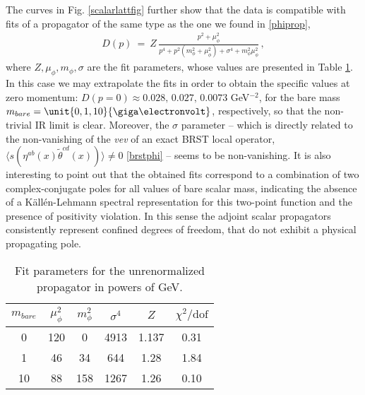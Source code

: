 The curves in Fig. \ref{scalarlattfig} further show that the data is compatible with fits of a
propagator of the same type as the one we found in \eqref{phiprop},
%
\begin{eqnarray}
D(p) ~=~ Z\,
\frac{p^2+\mu_{\phi}^2}{p^4+p^2(m_{\phi}^2+\mu_{\phi}^2)+\sigma^4+m_{\phi}^2\mu_{\phi}^2}
\,,\label{RGZfit}
\end{eqnarray}
%
where $Z,\mu_{\phi},m_{\phi},\sigma$ are the fit parameters, whose values are presented in
Table \ref{table:par}. In this case we may extrapolate the fits in order to obtain the specific values at
zero momentum: $D(p=0)\approx 0.028,\, 0.027,\, 0.0073$ GeV$^{-2}$, for the bare mass $m_{bare}
= \unit{0,1,10}{\giga\electronvolt}$, respectively, so that the non-trivial IR limit is clear.
Moreover, the $\sigma$ parameter -- which is directly related to the non-vanishing of the
\emph{vev} of an exact BRST local operator, $\langle s(\eta^{ab}(x)\tilde{\theta}^{cd}(x))
\rangle \neq 0$ \eqref{brstphi} -- seems to be non-vanishing.  It is also interesting to point
out that the obtained fits correspond to a combination of two complex-conjugate poles for all
values of bare scalar mass, indicating the absence of a K\"all\'en-Lehmann spectral
representation for this two-point function and the presence of positivity violation. In this
sense the adjoint scalar propagators  consistently represent confined degrees of freedom, that
do not exhibit a physical propagating pole.
    
    \begin{table}[ht]
 \caption{Fit parameters for the unrenormalized propagator in powers of GeV.}
 \vspace{0.3cm}
  \centering
   \begin{tabular}{c ||c| c| c| c||c}
    $m_{bare}$ & $\mu_{\phi}^2$ & $m_{\phi}^2$& $\sigma^4$ & $Z$&$\chi^2/\textrm{dof}$\\
    \hline\hline 
    0 & 120
    & 0 & 4913 & 1.137 &0.31\\
      \hline 
    1 & 46 & 34  & 644 & 1.28 & 1.84\\
      \hline 
    10 & 88
    & 158 & 1267 & 1.26 & 0.10
     \end{tabular}
     \label{table:par} 
    \end{table}
    
